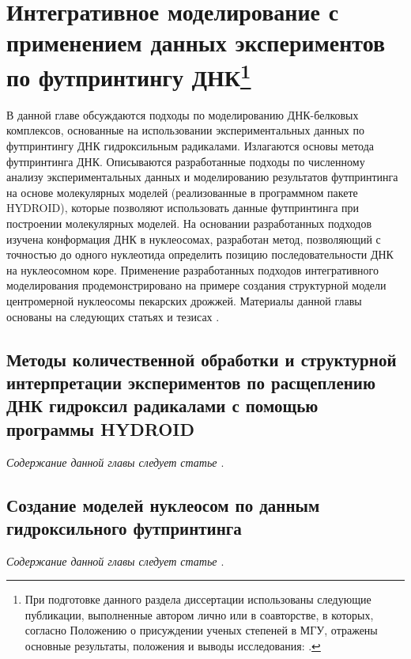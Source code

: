 \chapter[Интегративное моделирование с применением данных экспериментов по футпринтингу ДНК]{Интегративное моделирование с применением данных экспериментов по футпринтингу ДНК\footnote{При подготовке данного раздела диссертации использованы следующие публикации, выполненные автором лично или в соавторстве, в которых, согласно Положению о присуждении ученых степеней в МГУ, отражены основные результаты, положения и выводы исследования: \cite{shaytan_hydroxyl-radical_2017,shaytan_structural_2018,armeev_modeling_2016}.}} \label{part5_hrf}
В данной главе обсуждаются подходы по моделированию ДНК-белковых комплексов, основанные на использовании экспериментальных данных по футпринтингу ДНК гидроксильным радикалами. Излагаются основы метода футпринтинга ДНК. Описываются разработанные подходы по численному анализу экспериментальных данных и моделированию результатов футпринтинга на основе молекулярных моделей (реализованные в программном пакете HYDROID), которые позволяют использовать данные футпринтинга при построении молекулярных моделей. На основании разработанных подходов изучена конформация ДНК в нуклеосомах, разработан метод, позволяющий с точностью до одного нуклеотида определить позицию последовательности ДНК на нуклеосомном коре. Применение разработанных подходов интегративного моделирования продемонстрировано на примере создания структурной модели центромерной нуклеосомы пекарских дрожжей. Материалы данной главы основаны на следующих статьях \cite{shaytan_hydroxyl-radical_2017,shaytan_structural_2018,armeev_modeling_2016} и тезисах \cite{armeev_abstract_2019,armeev_integrative_2020}.


\section{Методы количественной обработки и структурной интерпретации экспериментов по расщеплению ДНК гидроксил радикалами с помощью программы HYDROID}
\textit{Содержание данной главы следует статье \cite{shaytan_structural_2018}}.




\section{Создание моделей нуклеосом по данным гидроксильного футпринтинга}
\textit{Содержание данной главы следует статье \cite{shaytan_hydroxyl-radical_2017}}.

